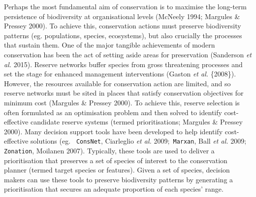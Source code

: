 \documentclass[11pt,]{article}
\begin{document}
Perhaps the most fundamental aim of conservation is to maximise the
long-term persistence of biodiversity at organisational levels (McNeely
1994; Margules \& Pressey 2000). To achieve this, conservation actions
must preserve biodiversity patterns (eg. populations, species,
ecosystems), but also crucially the processes that sustain them. One of
the major tangible achievements of modern conservation has been the act
of setting aside areas for preservation (Sanderson \emph{et al.} 2015).
Reserve networks buffer species from gross threatening processes and set
the stage for enhanced management interventions (Gaston \emph{et al.}
\{2008\}). However, the resources available for conservation action are
limited, and so reserve networks must be sited in places that satisfy
conservation objectives for minimum cost (Margules \& Pressey 2000). To
achieve this, reserve selection is often formulated as an optimisation
problem and then solved to identify cost-effective candidate reserve
systems (termed prioritisations; Margules \& Pressey 2000). Many
decision support tools have been developed to help identify
cost-effective solutions (eg. \texttt{ ConsNet}, Ciarleglio \emph{et
al.} 2009;\texttt{ Marxan}, Ball \emph{et al.} 2009;\texttt{ Zonation},
Moilanen 2007). Typically, these tools are used to deliver a
prioritisation that preserves a set of species of interest to the
conservation planner (termed target species or features). Given a set of
species, decision makers can use these tools to preserve biodiversity
patterns by generating a prioritisation that secures an adequate
proportion of each species' range.
\end{document}
